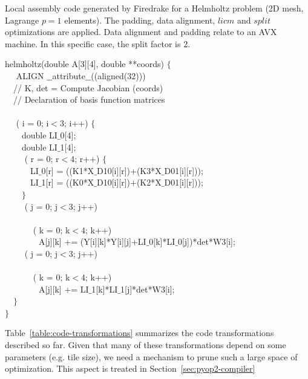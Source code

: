 \documentclass[conference]{IEEEtran}
\begin{document}
\begin{algorithm}[t]
\small
\caption{Local assembly code generated by Firedrake for a Helmholtz problem (2D mesh, Lagrange $p=1$ elements). The padding, data alignment, $licm$ and $split$ optimizations are applied. Data alignment and padding relate to an AVX machine. In this specific case, the split factor is 2.}
\label{code:helmholtz-split}
 helmholtz(double A[3][4], double **coords) $\lbrace$\\
~~ ALIGN $\_\_$attribute$\_\_$((aligned(32))) \\
~~// K, det = Compute Jacobian (coords) \\
~~// Declaration of basis function matrices \\
~~\\
~~ ( i = 0; i$<$3; i++) $\lbrace$ \\
~~~~double LI$\_$0[4];\\
~~~~double LI$\_$1[4];\\
~~~~ ( r = 0; r$<$4; r++) $\lbrace$ \\
~~~~~~LI$\_$0[r] = ((K1*X$\_$D10[i][r])+(K3*X$\_$D01[i][r]));\\
~~~~~~LI$\_$1[r] = ((K0*X$\_$D10[i][r])+(K2*X$\_$D01[i][r]));\\
~~~~$\rbrace$\\
~~~~ ( j = 0; j$<$3; j++) \\
~~~~~~\\
~~~~~~ ( k = 0; k$<$4; k++) \\
~~~~~~~~A[j][k] += (Y[i][k]*Y[i][j]+LI$\_$0[k]*LI$\_$0[j])*det*W3[i];\\
~~~~ ( j = 0; j$<$3; j++) \\
~~~~~~\\
~~~~~~ ( k = 0; k$<$4; k++) \\
~~~~~~~~A[j][k] += LI$\_$1[k]*LI$\_$1[j]*det*W3[i];\\
~~$\rbrace$\\
$\rbrace$
\end{algorithm}

Table~\ref{table:code-transformations} summarizes the code transformations described so far. Given that many of these transformations depend on some parameters (e.g. tile size), we need a mechanism to prune such a large space of optimization. This aspect is treated in Section~\ref{sec:pyop2-compiler}
\end{document}
